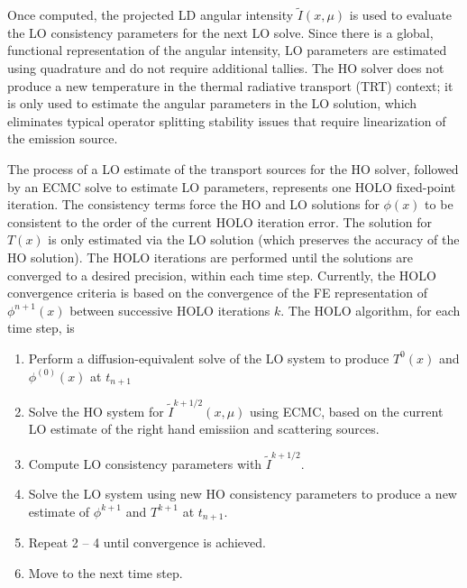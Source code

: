 \documentclass{mc2013}
\begin{document}
Once computed, the projected LD
angular intensity $\tilde{I}(x,\mu)$ is used to evaluate the LO
consistency parameters for the next LO solve.  Since there is a global, functional representation of
the angular intensity,  LO parameters are estimated using quadrature and do not require additional tallies.  The HO solver does not
produce a new temperature in the thermal radiative transport (TRT) context; it is
only used to estimate the angular parameters in the LO solution, which eliminates
typical operator splitting stability issues that require linearization of the emission source.

The process of a LO estimate of the transport sources for the HO solver, followed by
an ECMC
solve to estimate LO parameters, represents one HOLO fixed-point iteration.
The consistency terms force the HO
and LO solutions for $\phi(x)$ to be consistent to the order of the current HOLO
iteration error.  The solution for $T(x)$ is only estimated via the LO solution
(which preserves the accuracy of the HO solution). 
The HOLO iterations are performed until the solutions are converged to a
desired precision, within each time step.  Currently, the HOLO convergence criteria is based on
the convergence of the FE representation of $\phi^{n+1}(x)$ between successive HOLO iterations
$k$. The HOLO algorithm, for each time step, is

\begin{enumerate}
    \item Perform a diffusion-equivalent solve of the LO system to produce $T^0(x)$
        and $\phi^(0)(x)$ at $t_{n+1}$
\item Solve the HO system for $\tilde{I}^{k+1/2}(x,\mu)$ using ECMC, based on the current
    LO estimate of the right hand emissiion and scattering sources.%
\item Compute LO consistency parameters with $\tilde{I}^{k+1/2}$.  
\item Solve the LO system using new HO consistency parameters to produce a new
    estimate of $\phi^{k+1}$
    and $T^{k+1}$ at $t_{n+1}$.
\item Repeat 2 -- 4 until convergence is achieved.
\item Move to the next time step.
\end{enumerate}


\end{document}

